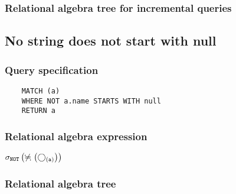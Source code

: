 	\subsubsection*{Relational algebra tree for incremental queries}

	\subsection{No string does not start with null}

	\subsubsection*{Query specification}

	\begin{lstlisting}
	MATCH (a)
	WHERE NOT a.name STARTS WITH null
	RETURN a
	\end{lstlisting}


	\subsubsection*{Relational algebra expression}

	$\selection{\mathtt{NOT}} \left(\alldifferent{} \left(\getvertices{a}{}\right)\right)$

	\subsubsection*{Relational algebra tree}


